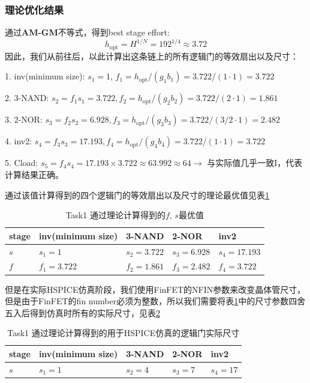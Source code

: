 \documentclass[UTF8,12pt,a4paper]{ctexart}
\begin{document}
\subsubsection{理论优化结果}

通过\textbf{AM-GM}不等式，得到best stage effort:
$$h_{\text{opt}} = H^{1/N} = 192^{1/4} \approx 3.72$$
因此，我们从前往后，以此计算出这条链上的所有逻辑门的等效扇出以及尺寸：

1. inv(minimum size): $s_1 = 1$, $f_1 = h_{\text{opt}}/(g_1 b_1) = 3.722/(1 \cdot 1) = 3.722$

2. 3-NAND: $s_2 = f_1 s_1 = 3.722, f_2 = h_{\text{opt}}/(g_2 b_2) = 3.722/(2 \cdot 1) = 1.861$

3. 2-NOR: $s_3 = f_2 s_2 = 6.928, f_3 = h_{\text{opt}}/(g_3 b_3) = 3.722/(3/2 \cdot 1) = 2.482$

4. inv2: $s_4 = f_3 s_3 = 17.193, f_4 = h_{\text{opt}}/(g_4 b_4) = 3.722/(1 \cdot 1) = 3.722$

5. Cload: $s_5 = f_4 s_4 = 17.193 \times 3.722 \approx 63.992 \approx 64 \rightarrow $ 与实际值几乎一致I，代表计算结果正确。

通过该值计算得到的四个逻辑门的等效扇出以及尺寸的理论最优值见表\ref{tab:task1_theo_best_sf}
\begin{table}[htbp]
    \centering
    \caption{Task1 通过理论计算得到的$f$, $s$最优值}
    \label{tab:task1_theo_best_sf}
    \begin{tabularx}{\linewidth}{XXXXX}
    \toprule
    stage & inv(minimum size) & 3-NAND & 2-NOR & inv2 \\
    \midrule
    $s$ & $s_1 = 1$ & $s_2 = 3.722$ & $s_3 = 6.928$ & $s_4 = 17.193$ \\
    $f$ & $f_1 = 3.722$ & $f_2 = 1.861$ & $f_3 = 2.482$ & $f_4 = 3.722$ \\
    \bottomrule
    \end{tabularx}
\end{table}

但是在实际HSPICE仿真阶段，我们使用FinFET的NFIN参数来改变晶体管尺寸，但是由于FinFET的fin number必须为整数，所以我们需要将表\ref{tab:task1_theo_best_sf}中的尺寸参数四舍五入后得到仿真时所有的实际尺寸，见表\ref{tab:task1_theo_best_sf_spice}
\begin{table}[htbp]
    \centering
    \caption{Task1 通过理论计算得到的用于HSPICE仿真的逻辑门实际尺寸}
    \label{tab:task1_theo_best_sf_spice}
    \begin{tabularx}{\linewidth}{XXXXX}
    \toprule
    stage & inv(minimum size) & 3-NAND & 2-NOR & inv2 \\
    \midrule
    $s$ & $s_1 = 1$ & $s_2 = 4$ & $s_3 = 7$ & $s_4 = 17$ \\
    \bottomrule
    \end{tabularx}
\end{table}
\end{document}
